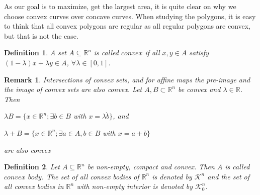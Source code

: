 \documentclass[a4paper]{book}
\newtheorem{remark}{Remark}%
\newtheorem{definition}{Definition}%
\begin{document}
As our goal is to maximize, get the largest area, it is quite clear on why we choose convex curves over concave curves. When studying the polygons, it is easy to think that all convex polygons are regular as all regular polygons are convex, but that is not the case.
\newline

\begin{definition}
	A set $A\subseteq\mathbb{R}^n$ is called $convex$ if all $x,y\in A$ satisfy $(1-\lambda)x+\lambda y\in A$, $\forall\lambda\in[0,1]$.
\end{definition}

\begin{remark}
	Intersections of convex sets, and for affine maps the pre-image and the image of convex sets are also convex. Let $A, B \subset\mathbb{R}^n$ be convex and $\lambda\in\mathbb{R}$. Then
	\begin{center}
		$\lambda B=\{x\in\mathbb{R}^n;\exists b\in B$ with $x=\lambda\dot b\}$, and
	
		$\lambda+B=\{x\in\mathbb{R}^n;\exists a\in A, b\in B$ with $x=a+b\}$
	\end{center}
	are also convex
\end{remark}

\begin{definition}
	Let $A\subseteq\mathbb{R}^n$ be non-empty, compact and convex. Then $A$ is called $convex$ $body$. The set of all convex bodies of $\mathbb{R}^n$ is denoted by $\mathscr{K}^n$ and the set of all convex bodies in $\mathbb{R}^n$ with non-empty interior is denoted by $\mathscr{K}_{0}^{n}$.
\end{definition}
\end{document}
